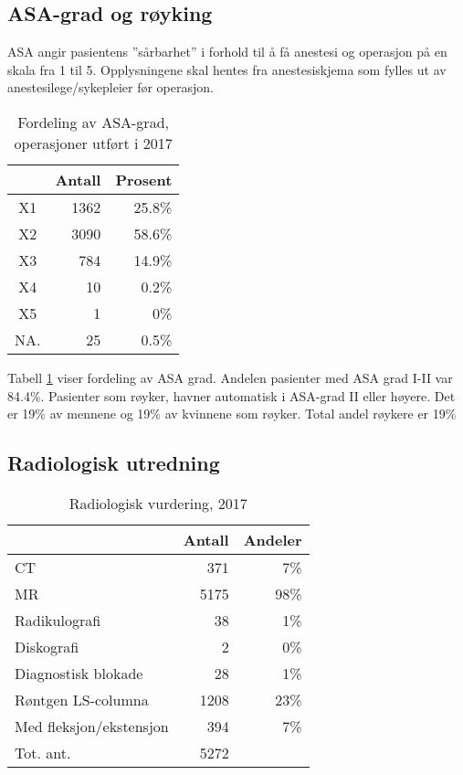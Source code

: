 \documentclass [norsk,a4paper,twoside]{article}\usepackage[]{graphicx}\usepackage[]{color}
\makeatletter
\newenvironment{kframe}{%
 \def\at@end@of@kframe{}%
 \ifinner\ifhmode%
  \def\at@end@of@kframe{\end{minipage}}%
  \begin{minipage}{\columnwidth}%
 \fi\fi%
 \def\FrameCommand##1{\hskip\@totalleftmargin \hskip-\fboxsep
 \colorbox{shadecolor}{##1}\hskip-\fboxsep
     \hskip-\linewidth \hskip-\@totalleftmargin \hskip\columnwidth}%
 \MakeFramed {\advance\hsize-\width
   \@totalleftmargin\z@ \linewidth\hsize
   \@setminipage}}%
 {\par\unskip\endMakeFramed%
 \at@end@of@kframe}
\makeatother
\begin{document}
\clearpage



\subsection{ASA-grad og røyking}
ASA angir pasientens ”sårbarhet” i forhold til å få anestesi og operasjon på en skala fra 1 til 5. 
Opplysningene skal hentes fra anestesiskjema som fylles ut av anestesilege/sykepleier før operasjon.
\begin{kframe}


{\ttfamily\noindent\bfseries\color{errorcolor}{\#\# Error in dimnames(x) <- dn: length of 'dimnames' [1] not equal to array extent}}\end{kframe}%
\begin{table}[ht]
\centering
\begin{tabular}{crr}
  \hline
 & Antall & Prosent \\ 
  \hline
X1 & 1362 & 25.8\% \\ 
  X2 & 3090 & 58.6\% \\ 
  X3 & 784 & 14.9\% \\ 
  X4 & 10 & 0.2\% \\ 
  X5 & 1 & 0\% \\ 
  NA. & 25 & 0.5\% \\ 
   \hline
\end{tabular}
\caption{Fordeling av ASA-grad, operasjoner utført i 2017} 
\label{tab:ASA}
\end{table}


Tabell \ref{tab:ASA} viser fordeling av ASA grad. Andelen pasienter med ASA grad I-II 
var 84.4\%. Pasienter som røyker, havner 
automatisk i ASA-grad II eller høyere. 
Det er 19\% av mennene og 19\% av kvinnene som røyker. 
                    Total andel røykere er 19\%



\subsection{Radiologisk utredning}

\begin{table}[ht]
\centering
\begin{tabular}{lrr}
  \hline
 & Antall & Andeler \\ 
  \hline
CT & 371 & 7\% \\ 
  MR & 5175 & 98\% \\ 
  Radikulografi & 38 & 1\% \\ 
  Diskografi & 2 & 0\% \\ 
  Diagnostisk blokade & 28 & 1\% \\ 
  Røntgen LS-columna & 1208 & 23\% \\ 
  Med fleksjon/ekstensjon & 394 & 7\% \\ 
  Tot. ant. & 5272 &   \\ 
   \hline
\end{tabular}
\caption{Radiologisk vurdering, 2017} 
\label{tab:RV}
\end{table}
\end{document}
